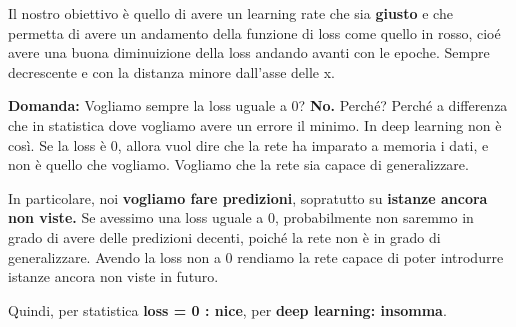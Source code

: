 Il nostro obiettivo è quello di avere un learning rate che sia \textbf{giusto}
e che permetta di avere un andamento della funzione di loss come quello in
rosso, cioé avere una buona diminuizione della loss andando avanti con le
epoche. Sempre decrescente e con la distanza minore dall'asse delle x.

\textbf{Domanda:} Vogliamo sempre la loss uguale a 0? \textbf{No.}
Perché? Perché a differenza che in statistica dove vogliamo avere un errore il minimo.
In deep learning non è così. Se la loss è 0, allora vuol dire che la rete ha
imparato a memoria i dati, e non è quello che vogliamo. Vogliamo che la rete
sia capace di generalizzare.

In particolare, noi \textbf{vogliamo fare predizioni}, sopratutto su
\textbf{istanze ancora non viste.} Se avessimo una loss uguale a 0,
probabilmente non saremmo in grado di avere delle predizioni decenti, poiché la
rete non è in grado di generalizzare. Avendo la loss non a 0 rendiamo la rete
capace di poter introdurre istanze ancora non viste in futuro.

Quindi, per statistica \textbf{loss = 0 : nice}, per \textbf{deep learning:
    insomma}.

